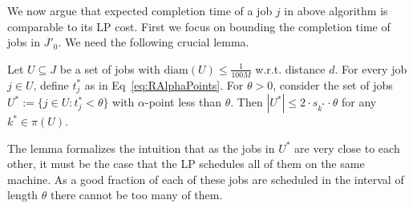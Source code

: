   We now argue that expected completion time of a job $j$ in above algorithm is comparable to its LP cost.
  First we focus on bounding the completion time of jobs in $J'_0$.
  We need the following crucial lemma.
  
  \begin{lemma} 
  \label{lem:RAlphapointBound}
  Let $U \subseteq J$ be a set of jobs  with $\textrm{diam}(U) \leq \frac{1}{100M}$ w.r.t. distance $d$. 
  For every job $j \in U$,  define $t_j^*$ as in Eq~\eqref{eq:RAlphaPoints}. 
  For $\theta > 0$, consider the set of jobs $U^* := \{ j \in U: t_j^* < \theta \} $ with $\alpha$-point less than $\theta$.  
  Then $|U^*| \leq 2 \cdot s_{k^*} \cdot \theta$ for any $k^* \in \pi(U)$.
   \end{lemma}
  
  The lemma formalizes the intuition that as the jobs in $U^*$ are very close to each other, it must be the case that the LP schedules all of them on the same machine.
  As a good fraction of each of these jobs are scheduled in the interval of length $\theta$ there cannot be too many of them.
  
